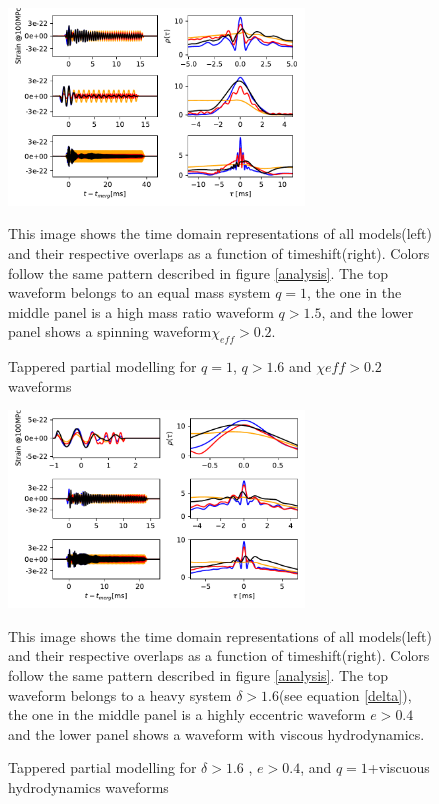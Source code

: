 \begin{figure}[hbt!]
\begin{center}
\includegraphics[width=0.7\textwidth, angle=0]{images/Data_analysis/results/phi-A3.pdf}
\caption{Tappered partial modelling for $q=1$, $q>1.6$ and $\chi{eff}>0.2$ waveforms}
\end{center}
This image shows the time domain representations of all models(left) and their respective overlaps as a function of timeshift(right). Colors follow the same pattern described in figure \ref{analysis}. The top waveform belongs to an equal mass system $q=1$, the one in the middle panel is a high mass ratio waveform $q>1.5$, and the lower panel shows a spinning waveform$\chi_{eff}>0.2$.
\end{figure}

\begin{figure}[hbt!]
\begin{center}
\includegraphics[width=0.7\textwidth, angle=0]{images/Data_analysis/results/phi-A4.pdf}
\caption{Tappered partial modelling for $\delta>1.6$ , $e>0.4$, and $q=1$+viscuous hydrodynamics waveforms}
\end{center}
This image shows the time domain representations of all models(left) and their respective overlaps as a function of timeshift(right). Colors follow the same pattern described in figure \ref{analysis}. The top waveform belongs to a heavy system $\delta>1.6$(see equation \ref{delta}), the one in the middle panel is a highly eccentric waveform $e>0.4$ and the lower panel shows a waveform with viscous hydrodynamics.
\end{figure}
\FloatBarrier





